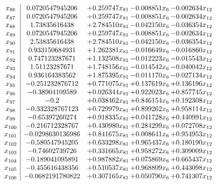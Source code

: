 \documentclass[11pt]{article}
\begin{document}
\[\begin{array}{c| c c@{\hskip 2pt} c@{\hskip 2pt} c@{\hskip 2pt} }
 x_{86}   &  0.0720547945206 & + 0.259747 x_{81} & -0.008851 x_{6} & -0.002634 x_{12}\\
 x_{87}   &  0.0720547945206 & + 0.259747 x_{81} & -0.008851 x_{6} & -0.002634 x_{12}\\
 x_{88}   &  1.73835616438 & + 2.784510 x_{81} & -0.042150 x_{6} & -0.036354 x_{12}\\
 x_{89}   &  0.0720547945206 & + 0.259747 x_{81} & -0.008851 x_{6} & -0.002634 x_{12}\\
 x_{90}   &  2.53835616438 & + 2.784510 x_{81} & -0.042150 x_{6} & -0.036354 x_{12}\\
 x_{91}   &  0.933150684931 & + 1.262381 x_{81} & -0.016649 x_{6} & -0.016860 x_{12}\\
 x_{92}   &  0.747123287671 & + 1.132508 x_{81} & -0.012223 x_{6} & -0.015543 x_{12}\\
 x_{93}   &  1.51123287671 & + 1.748156 x_{81} & -0.014542 x_{6} & -0.040042 x_{12}\\
 x_{94}   &  0.936164383562 & + 1.875395 x_{81} & -0.011170 x_{6} & -0.027134 x_{12}\\
 x_{95}   &  -0.251232876712 & + 0.771075 x_{81} & + 0.137619 x_{6} & + 0.136196 x_{12}\\
 x_{96}   &  -0.38904109589 & + 0.026344 x_{81} & + 0.922023 x_{6} & + 0.857745 x_{12}\\
 x_{97}   &  -0.2 & + 0.038462 x_{81} & + 0.846154 x_{6} & + 0.192308 x_{12}\\
 x_{98}   &  -0.332328767123 & + 0.729979 x_{81} & + 0.899262 x_{6} & + 0.958114 x_{12}\\
 x_{99}   &  -0.65397260274 & + 0.918335 x_{81} & + 0.041728 x_{6} & + 0.440991 x_{12}\\
 x_{100}   &  -0.216712328767 & + 0.430980 x_{81} & + 0.284299 x_{6} & + 0.072708 x_{12}\\
 x_{101}   &  -0.0298630136986 & + 0.841675 x_{81} & + 0.008641 x_{6} & + 0.954953 x_{12}\\
 x_{102}   &  -0.580547945205 & + 0.633298 x_{81} & + 0.965437 x_{6} & + 0.180190 x_{12}\\
 x_{103}   &  -0.74602739726 & + 0.331665 x_{81} & + 0.958272 x_{6} & + 0.309009 x_{12}\\
 x_{104}   &  -0.189041095891 & + 0.987882 x_{81} & + 0.075869 x_{6} & + 0.665437 x_{12}\\
 x_{105}   &  -0.455616438356 & + 0.510537 x_{81} & + 0.968809 x_{6} & + 0.443098 x_{12}\\
 x_{106}   &  -0.0682191780822 & + 0.307165 x_{81} & + 0.050790 x_{6} & + 0.741307 x_{12}\\

\end{array}\]
\end{document}
